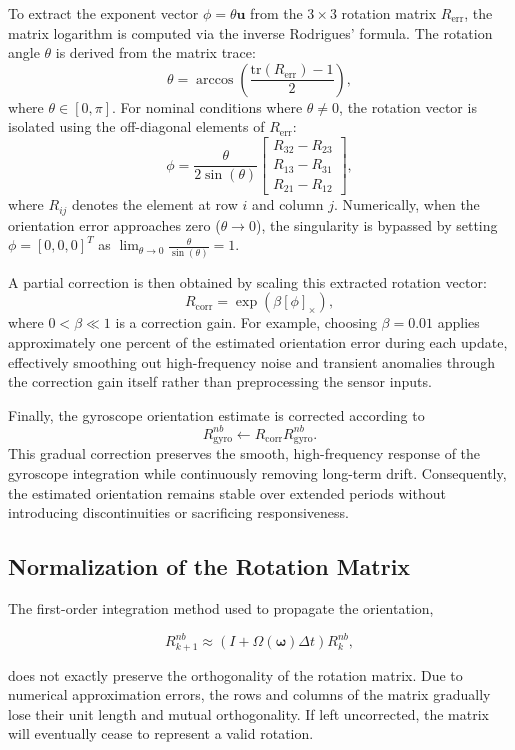 \documentclass{article}
\begin{document}
To extract the exponent vector $\phi = \theta \mathbf{u}$ from the $3 \times 3$ rotation matrix $R_{\mathrm{err}}$, the matrix logarithm is computed via the inverse Rodrigues' formula. The rotation angle $\theta$ is derived from the matrix trace:
\[
\theta = \arccos\left(\frac{\text{tr}(R_{\mathrm{err}}) - 1}{2}\right),
\]
where $\theta \in [0, \pi]$. For nominal conditions where $\theta \neq 0$, the rotation vector is isolated using the off-diagonal elements of $R_{\mathrm{err}}$:
\[
\phi = \frac{\theta}{2\sin(\theta)} \begin{bmatrix} R_{32} - R_{23} \\ R_{13} - R_{31} \\ R_{21} - R_{12} \end{bmatrix},
\]
where $R_{ij}$ denotes the element at row $i$ and column $j$. Numerically, when the orientation error approaches zero ($\theta \to 0$), the singularity is bypassed by setting $\phi = [0, 0, 0]^T$ as $\lim_{\theta \to 0} \frac{\theta}{\sin(\theta)} = 1$. 

A partial correction is then obtained by scaling this extracted rotation vector:
\[
R_{\mathrm{corr}}
=
\exp(\beta [\phi]_\times),
\]
where $0 < \beta \ll 1$ is a correction gain. For example, choosing $\beta = 0.01$ applies approximately one percent of the estimated orientation error during each update, effectively smoothing out high-frequency noise and transient anomalies through the correction gain itself rather than preprocessing the sensor inputs.

Finally, the gyroscope orientation estimate is corrected according to
\[
R_{\mathrm{gyro}}^{nb}
\leftarrow
R_{\mathrm{corr}}
R_{\mathrm{gyro}}^{nb}.
\]
This gradual correction preserves the smooth, high-frequency response of the gyroscope integration while continuously removing long-term drift. Consequently, the estimated orientation remains stable over extended periods without introducing discontinuities or sacrificing responsiveness.

\subsection{Normalization of the Rotation Matrix}

The first-order integration method used to propagate the orientation,

\[
R_{k+1}^{nb} \approx \left(I + \Omega(\boldsymbol{\omega})\Delta t\right)R_k^{nb},
\]

does not exactly preserve the orthogonality of the rotation matrix. Due to numerical approximation errors, the rows and columns of the matrix gradually lose their unit length and mutual orthogonality. If left uncorrected, the matrix will eventually cease to represent a valid rotation.
\end{document}
